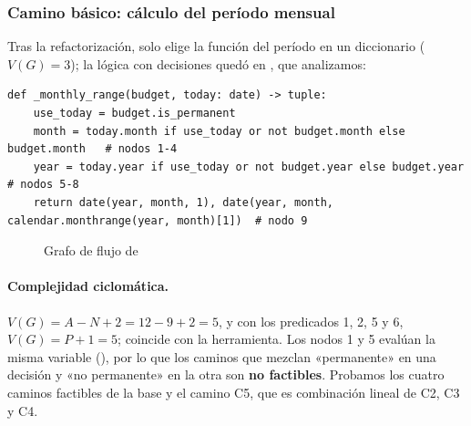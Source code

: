 \subsubsection{Camino básico: cálculo del período mensual}

Tras la refactorización,  solo elige la función del período en un diccionario ($V(G) = 3$); la lógica con decisiones quedó en , que analizamos:

\begin{verbatim}
def _monthly_range(budget, today: date) -> tuple:
    use_today = budget.is_permanent
    month = today.month if use_today or not budget.month else budget.month   # nodos 1-4
    year = today.year if use_today or not budget.year else budget.year       # nodos 5-8
    return date(year, month, 1), date(year, month, calendar.monthrange(year, month)[1])  # nodo 9
\end{verbatim}

\begin{figure}[H]
\centering
\caption{Grafo de flujo de }
\label{fig:grafo-mensual}
\end{figure}

\paragraph{Complejidad ciclomática.} $V(G) = A - N + 2 = 12 - 9 + 2 = 5$, y con los predicados 1, 2, 5 y 6, $V(G) = P + 1 = 5$; coincide con la herramienta. Los nodos 1 y 5 evalúan la misma variable (), por lo que los caminos que mezclan «permanente» en una decisión y «no permanente» en la otra son \textbf{no factibles}. Probamos los cuatro caminos factibles de la base y el camino C5, que es combinación lineal de C2, C3 y C4.


